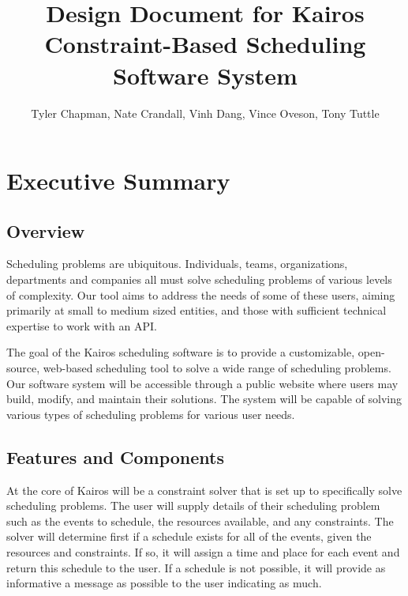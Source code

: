 \documentclass{extarticle}
\begin{document}
\begin{titlepage}
\title{Design Document for Kairos Constraint-Based Scheduling Software System}
\author{Tyler Chapman, Nate Crandall, Vinh Dang, Vince Oveson, Tony Tuttle}
\maketitle
\thispagestyle{empty}
\end{titlepage}

\tableofcontents
\listoffigures

\newpage

\section{Executive Summary} %

\subsection{Overview}
Scheduling problems are ubiquitous.  Individuals, teams, organizations, departments and companies all must solve
scheduling problems of various levels of complexity.  Our tool aims to address the needs of some of these users,
aiming primarily at small to medium sized entities, and those with sufficient technical expertise to work with an
API.

The goal of the Kairos scheduling software is to provide a customizable, open-source, web-based scheduling tool to 
solve a wide range of scheduling problems.  Our software system will be accessible through a public
website where users may build, modify, and maintain their solutions.  The system will be capable of solving various
types of scheduling problems for various user needs.

\subsection{Features and Components}
At the core of Kairos will be a constraint solver that is set up to specifically solve scheduling problems.  The
user will supply details of their scheduling problem such as the events to schedule, the resources available, and
any constraints.  The solver will determine first if a schedule exists for all of the events, given the resources
and constraints.  If so, it will assign a time and place for each event and return this schedule to the user.  If
a schedule is not possible, it will provide as informative a message as possible to the user indicating as much.
\end{document}
